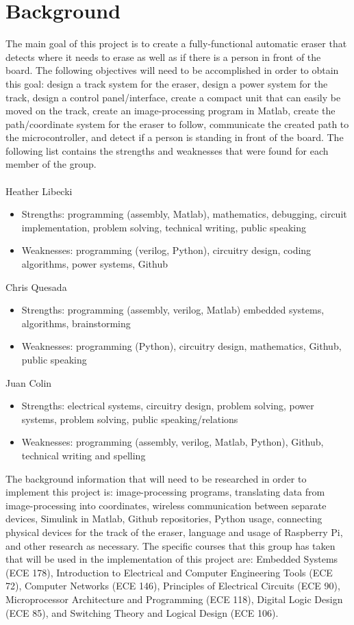 \documentclass{IEEEtran}					%
\begin{document}
	\section{Background}
	The main goal of this project is to create a fully-functional automatic eraser that detects where it needs to erase as well as if there is a person in front of the board. The following objectives will need to be accomplished in order to obtain this goal: design a track system for the eraser, design a power system for the track, design a control panel/interface, create a compact unit that can easily be moved on the track, create an image-processing program in Matlab, create the path/coordinate system for the eraser to follow, communicate the created path to the microcontroller, and detect if a person is standing in front of the board.
	The following list contains the strengths and weaknesses that were found for each member of the group.\\\\
	Heather Libecki
	\begin{itemize}
		\item Strengths: programming (assembly, Matlab), mathematics, debugging, circuit implementation, problem solving, technical writing, public speaking
	 	\item Weaknesses: programming (verilog, Python), circuitry design, coding algorithms, power systems, Github
 	\end{itemize}
 	Chris Quesada
	\begin{itemize}
		\item Strengths: programming (assembly, verilog, Matlab) embedded systems, algorithms, brainstorming
		\item Weaknesses: programming (Python), circuitry design, mathematics, Github, public speaking
	\end{itemize}
	Juan Colin
	\begin{itemize}
		\item Strengths: electrical systems, circuitry design, problem solving, power systems, problem solving, public speaking/relations
		\item Weaknesses: programming (assembly, verilog, Matlab, Python), Github, technical writing and spelling \\
	\end{itemize} 
	\par
	\setlength{\parindent}{5ex} 
	The background information that will need to be researched in order to implement this project is: image-processing programs, translating data from image-processing into coordinates, wireless communication between separate devices, Simulink in Matlab, Github repositories, Python usage, connecting physical devices for the track of the eraser, language and usage of Raspberry Pi, and other research as necessary. The specific courses that this group has taken that will be used in the implementation of this project are: Embedded Systems (ECE 178), Introduction to Electrical and Computer Engineering Tools (ECE 72), Computer Networks (ECE 146), Principles of Electrical Circuits (ECE 90), Microprocessor Architecture and Programming (ECE 118), Digital Logic Design (ECE 85), and Switching Theory and Logical Design (ECE 106).
	
\end{document}
